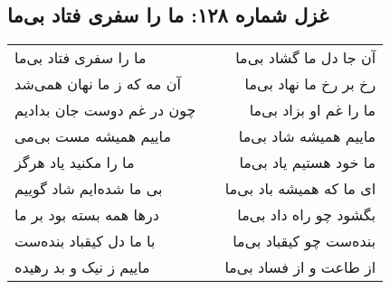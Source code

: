 \begin{center}
\section*{غزل شماره ۱۲۸: ما را سفری فتاد بی‌ما}
\label{sec:0128}
\begin{longtable}{l p{0.5cm} r}
ما را سفری فتاد بی‌ما
&&
آن جا دل ما گشاد بی‌ما
\\
آن مه که ز ما نهان همی‌شد
&&
رخ بر رخ ما نهاد بی‌ما
\\
چون در غم دوست جان بدادیم
&&
ما را غم او بزاد بی‌ما
\\
ماییم همیشه مست بی‌می
&&
ماییم همیشه شاد بی‌ما
\\
ما را مکنید یاد هرگز
&&
ما خود هستیم یاد بی‌ما
\\
بی ما شده‌ایم شاد گوییم
&&
ای ما که همیشه باد بی‌ما
\\
درها همه بسته بود بر ما
&&
بگشود چو راه داد بی‌ما
\\
با ما دل کیقباد بنده‌ست
&&
بنده‌ست چو کیقباد بی‌ما
\\
ماییم ز نیک و بد رهیده
&&
از طاعت و از فساد بی‌ما
\\
\end{longtable}
\end{center}
